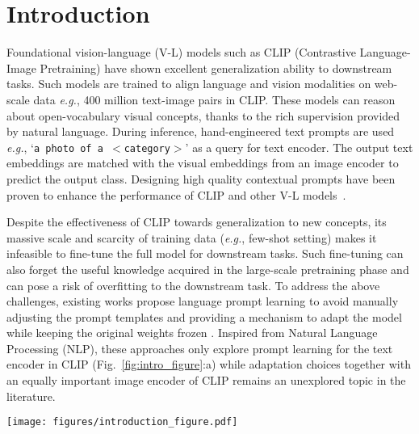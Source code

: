 \documentclass[10pt,twocolumn,letterpaper]{article}
\def\eg{\emph{e.g.}\xspace}
\begin{document}
\section{Introduction}
\label{sec:intro}
\noindent Foundational vision-language (V-L) models such as CLIP (Contrastive Language-Image Pretraining) \cite{radford2021learning} have shown excellent generalization ability to downstream tasks. Such models are trained to align language and vision modalities on web-scale data \eg, 400 million text-image pairs in CLIP. These models can reason about open-vocabulary visual concepts, thanks to the rich supervision provided by natural language. During inference, hand-engineered text prompts are used \eg, ‘\texttt{a photo of a $<$category$>$}’ as a query for text encoder. The output text embeddings are matched with the visual embeddings from an image encoder to predict the output class. Designing high quality contextual prompts have been proven to enhance the performance of CLIP and other V-L models~\cite{jin2021good, yao2021cpt}.

    Despite the effectiveness of CLIP towards generalization to new concepts, its massive scale {and scarcity of training data (\eg, few-shot setting)} makes it infeasible to fine-tune the full model for downstream tasks. Such fine-tuning can also forget the useful knowledge acquired in the large-scale pretraining phase and can pose a risk of overfitting to the downstream task. To address the above challenges, existing works propose language prompt learning to avoid manually adjusting the prompt templates and providing a mechanism to adapt the model while keeping the original weights frozen \cite{zhou2022conditional, zhou2022learning, lu2022prompt,huang2022unsupervised, shu2022tpt}. Inspired from Natural Language Processing (NLP), these approaches only explore prompt learning for the text encoder in CLIP (Fig.~\ref{fig:intro_figure}:a) {while adaptation choices together with an equally important image encoder of CLIP remains an unexplored topic in the literature.}

\begin{figure*}[!t]
\centering
{\texttt{[image: figures/introduction\_figure.pdf]}} \caption{\small Comparison of MaPLe with standard prompt learning methods. {\color{blue}\textbf{(a)}} Existing methods adopt uni-modal prompting techniques to fine-tune CLIP representations as prompts are learned only in a single branch of CLIP (language or vision). {\color{blue}\textbf{(b)}} MaPLe introduces branch-aware hierarchical prompts that adapt both language and vision branches simultaneously for improved generalization. {\color{blue}\textbf{(c)}} MaPLe surpasses state-of-the-art methods on 11 diverse image recognition datasets for novel class generalization task.}
\label{fig:intro_figure}
\end{figure*}
\end{document}
